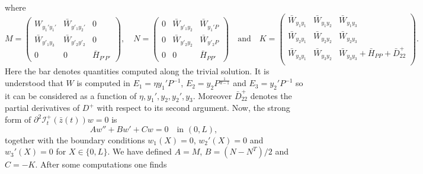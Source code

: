 \documentclass[a4paper,10pt,oneside]{amsbook}
\numberwithin{section}{chapter}
\numberwithin{equation}{chapter}
\theoremstyle{definition}
\begin{document}
where
\[
M=\begin{pmatrix}
    W_{y_1'y_1'} & \bar{W}_{y'_1 y_2'} & 0 \\
    \bar{W}_{y'_1 y_3} & \bar{W}_{y'_2 y'_2} & 0 \\
    0             & 0             & \bar{H}_{P'P'}
\end{pmatrix},\quad
N=\begin{pmatrix}
    0 & \bar{W}_{y'_1 y_2} & \bar{W}_{y_1'P} \\
    0 & \bar{W}_{y'_2 y_2} & \bar{W}_{y'_2P} \\
    0 & 0  & \bar{H}_{PP'}
\end{pmatrix}\quad\text{and}\quad
K=\begin{pmatrix}
    \bar{W}_{y_1y_1} & \bar{W}_{y_1y_2} & \bar{W}_{y_1y_3} \\
    \bar{W}_{y_2y_1} & \bar{W}_{y_2y_2} & \bar{W}_{y_2y_3} \\
    \bar{W}_{y_3y_1} & \bar{W}_{y_3y_2} & \bar{W}_{y_3y_3}+\bar{H}_{PP}+\bar{D}_{22}^+ \\
\end{pmatrix}.
\]
Here the bar denotes quantities computed along the trivial solution. It is understood that $W$ is computed in $E_1=\eta y_1'P^{-1}$, $E_2=y_2P^\frac{1}{d-1}$ and $E_3=y_2'P^{-1}$ so it can be considered as a function of $\eta,y_1',y_2,y_2',y_3$. Moreover $\bar{D}_{22}^+$ denotes the partial derivatives of $D^+$ with respect to its second argument. Now, the strong form of $\partial^2\mathcal{I}_t^+(\bar{z}(t))w=0$ is
\begin{equation}
\label{eqn:2order}
Aw''+Bw'+Cw=0\quad\text{in $(0,L)$},
\end{equation}
together with the boundary conditions $w_1(X)=0$, $w_2'(X)=0$ and $w_3'(X)=0$ for $X\in\{0,L\}$. We have defined $A=M$, $B=(N-N^T)/2$ and $C=-K$. After some computations one finds
\begingroup
\tiny
\end{document}
